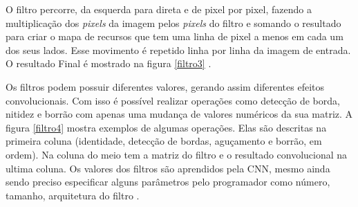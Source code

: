 \begin{figure}[H]
	\centering
\end{figure}

O filtro percorre, da esquerda para direta e de pixel por pixel, fazendo a multiplicação dos \textit{pixels} da imagem pelos \textit{pixels} do filtro e somando o resultado para criar o mapa de recursos que tem uma linha de pixel a menos em cada um dos seus lados. Esse movimento é repetido linha por linha da imagem de entrada. O resultado Final é mostrado na figura \ref{filtro3} \cite{conv2, freecodecamp}.

 \begin{figure}[H]
	\centering
\end{figure}

Os filtros podem possuir diferentes valores, gerando assim diferentes efeitos convolucionais. Com isso é possível realizar operações como detecção de borda, nitidez e borrão com apenas uma mudança de valores numéricos da sua matriz. A figura \ref{filtro4} mostra exemplos de algumas operações. Elas são descritas na primeira coluna (identidade, detecção de bordas, aguçamento e borrão, em ordem). Na coluna do meio tem a matriz do filtro e o resultado convolucional na ultima coluna. Os  valores dos filtros são aprendidos pela CNN, mesmo ainda sendo preciso especificar alguns parâmetros pelo programador como número, tamanho, arquitetura do filtro \cite{conv2, aprendizadoDeMaquinaDivertido}.

